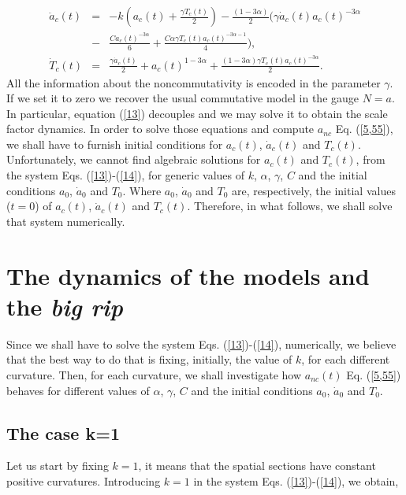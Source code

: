 \documentclass[12pt]{article}
\newcommand{\0}{{(0)}}
\newcommand{\1}{{(1)}}
\newcommand{\2}{{(2)}}
\begin{document}
{\begin{eqnarray}
\ddot{a}_{c}(t) & = &  -k ( a_{c}(t) +\frac{\gamma T_{c}(t)}{2})  
- \frac{(1 - 3\alpha)}{2}( \gamma \dot{a}_{c}(t) a_{c}(t)^{-3\alpha}\nonumber \\ 
&-& \frac{C a_{c}(t)^{-3\alpha}}{6} + \frac{C\alpha \gamma T_{c}(t)a_{c}(t)^{-3\alpha - 1}}{4}), \label{13}\\
\dot{T}_{c}(t) & =&  \frac{\gamma \dot{a}_{c}(t)}{2} + a_{c}(t)^{1 - 3\alpha} + \frac{(1 - 3\alpha)\gamma T_{c}(t) a_{c}(t)^{-3\alpha}}{2}. 
\label{14}
\end{eqnarray}
All the information about the noncommutativity is encoded in the parameter $\gamma$. If we set it to zero we recover the usual
commutative model in the gauge $N=a$. In particular, equation (\ref{13}) decouples and we may solve it to obtain the scale factor
dynamics. In order to solve those equations and compute $a_{nc}$ Eq. (\ref{5,55}), we shall have to furnish initial conditions for 
$a_c(t)$, $\dot a_c(t)$ and $T_c(t)$. 
Unfortunately, we cannot find algebraic solutions for $a_c(t)$ and $T_c(t)$, from the system Eqs. (\ref{13})-(\ref{14}), for generic 
values of $k$, $\alpha$, $\gamma$, $C$ and the initial conditions $a_0$, $\dot a_0$ and $T_0$. Where $a_0$, $\dot a_0$ and $T_0$ are, 
respectively, the initial values ($t = 0$) of $a_c(t)$, $\dot a_c(t)$ and $T_c(t)$. Therefore, in what follows, we shall solve that 
system numerically.

\section{The dynamics of the models and the {\it big rip}}
\label{sec:radiation}

Since we shall have to solve the system Eqs. (\ref{13})-(\ref{14}), numerically, we believe that the best way to do that is fixing,
initially, the value of $k$, for each different curvature. Then, for each curvature, we shall investigate how $a_{nc}(t)$ Eq. (\ref{5,55})
behaves for different values of $\alpha$, $\gamma$, $C$ and the initial conditions $a_0$, $\dot a_0$ and $T_0$. 

\subsection{The case k=1}
\label{k=1}

Let us start by fixing $k=1$, it means that the spatial sections have constant positive curvatures. Introducing $k=1$ in the system 
Eqs. (\ref{13})-(\ref{14}), we obtain,

}
\end{document}
